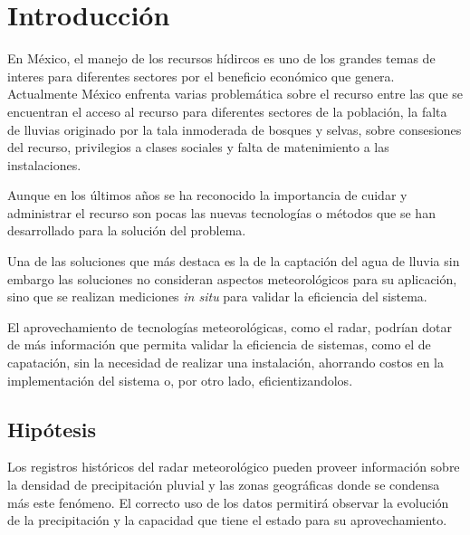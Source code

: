 \documentclass[letterpaper,12pt,oneside]{book}
\begin{document}


\chapter{Introducción}
    En México, el manejo de los recursos hídircos es uno de los grandes temas de interes para diferentes sectores por el beneficio económico que genera. 
    Actualmente México enfrenta varias problemática sobre el recurso entre las que se encuentran el acceso al recurso para diferentes sectores de la población, la falta de lluvias originado por la tala inmoderada de bosques y selvas, sobre consesiones del recurso\cite{jornada:agua}, privilegios a clases sociales y falta de matenimiento a las instalaciones.

    Aunque en los últimos años se ha reconocido la importancia de cuidar y administrar el recurso \cite{de2019objetivo} \cite{mex:procaptar} son pocas las nuevas tecnologías o métodos que se han desarrollado para la solución del problema. 

    Una de las soluciones que más destaca es la de la captación del agua de lluvia \cite{comision2016lineamientos} \cite{hugues2019captacion} \cite{nickisch2018sistemas} \cite{van2013captacion} sin embargo las soluciones no consideran aspectos meteorológicos para su aplicación, sino que se realizan mediciones \textit{in situ} para validar la eficiencia del sistema.

    El aprovechamiento de tecnologías meteorológicas, como el radar, podrían dotar de más información que permita validar la eficiencia de sistemas, como el de capatación, sin la necesidad de realizar una instalación, ahorrando costos en la implementación del sistema o, por otro lado, eficientizandolos.

    \section{Hipótesis}
        Los registros históricos del radar meteorológico pueden proveer información sobre la densidad de precipitación pluvial y las zonas geográficas donde se condensa más este fenómeno. El correcto uso de los datos permitirá observar la evolución de la precipitación y la capacidad que tiene el estado para su aprovechamiento.
\end{document}
